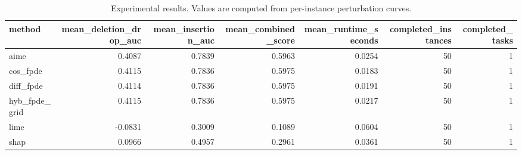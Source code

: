 \begin{table}[t]
\caption{Experimental results. Values are computed from per-instance perturbation curves.}
\label{tab:main_results_computed}
\centering
\begin{tabular}{lrrrrrr}
\toprule
method & mean\_deletion\_drop\_auc & mean\_insertion\_auc & mean\_combined\_score & mean\_runtime\_seconds & completed\_instances & completed\_tasks \\
\midrule
aime & 0.4087 & 0.7839 & 0.5963 & 0.0254 & 50 & 1 \\
cos\_fpde & 0.4115 & 0.7836 & 0.5975 & 0.0183 & 50 & 1 \\
diff\_fpde & 0.4114 & 0.7836 & 0.5975 & 0.0191 & 50 & 1 \\
hyb\_fpde\_grid & 0.4115 & 0.7836 & 0.5975 & 0.0217 & 50 & 1 \\
lime & -0.0831 & 0.3009 & 0.1089 & 0.0604 & 50 & 1 \\
shap & 0.0966 & 0.4957 & 0.2961 & 0.0361 & 50 & 1 \\
\bottomrule
\end{tabular}

\end{table}

